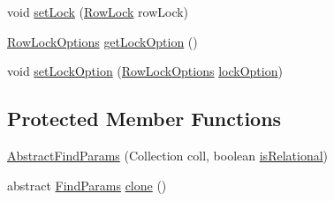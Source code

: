 \begin{DoxyCompactItemize}
\item 
void \mbox{\hyperlink{classcom_1_1mysql_1_1cj_1_1xdevapi_1_1_abstract_find_params_a5363ab2b37ba6e1f800ea99bbbb4503f}{set\+Lock}} (\mbox{\hyperlink{enumcom_1_1mysql_1_1cj_1_1xdevapi_1_1_find_params_1_1_row_lock}{Row\+Lock}} row\+Lock)
\item 
\mbox{\hyperlink{enumcom_1_1mysql_1_1cj_1_1xdevapi_1_1_find_params_1_1_row_lock_options}{Row\+Lock\+Options}} \mbox{\hyperlink{classcom_1_1mysql_1_1cj_1_1xdevapi_1_1_abstract_find_params_aca952c3798af9960461b683aee46117e}{get\+Lock\+Option}} ()
\item 
void \mbox{\hyperlink{classcom_1_1mysql_1_1cj_1_1xdevapi_1_1_abstract_find_params_af4699947772c548ae743375658898d7e}{set\+Lock\+Option}} (\mbox{\hyperlink{enumcom_1_1mysql_1_1cj_1_1xdevapi_1_1_find_params_1_1_row_lock_options}{Row\+Lock\+Options}} \mbox{\hyperlink{classcom_1_1mysql_1_1cj_1_1xdevapi_1_1_abstract_find_params_a377d2b6854306fcce18c8a69f5ee5453}{lock\+Option}})
\end{DoxyCompactItemize}
\subsection*{Protected Member Functions}
\begin{DoxyCompactItemize}
\item 
\mbox{\hyperlink{classcom_1_1mysql_1_1cj_1_1xdevapi_1_1_abstract_find_params_ab6ea9d60c82a25e090429565e563d9fa}{Abstract\+Find\+Params}} (Collection coll, boolean \mbox{\hyperlink{classcom_1_1mysql_1_1cj_1_1xdevapi_1_1_filter_params_a0224c120aec3648050bdf39abf891859}{is\+Relational}})
\item 
abstract \mbox{\hyperlink{interfacecom_1_1mysql_1_1cj_1_1xdevapi_1_1_find_params}{Find\+Params}} \mbox{\hyperlink{classcom_1_1mysql_1_1cj_1_1xdevapi_1_1_abstract_find_params_ac5fff4e345888b472e9468487e7b7621}{clone}} ()
\end{DoxyCompactItemize}
